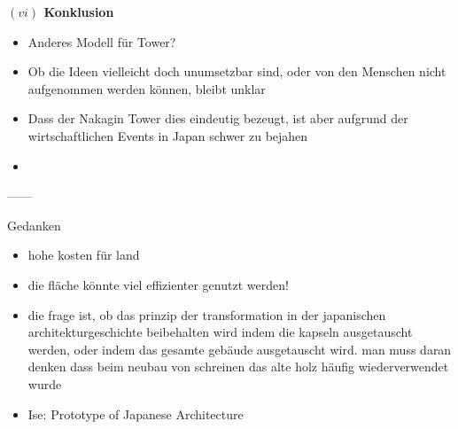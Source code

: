 \documentclass[a4paper, 12pt]{article}
\begin{document}
\begin{onehalfspace}


\vspace{5mm}
\noindent\textbf{$(vi)$ Konklusion}

\begin{itemize}
  \item Anderes Modell für Tower?
  \item Ob die Ideen vielleicht doch unumsetzbar sind, oder von den Menschen nicht aufgenommen werden können, bleibt unklar
  \item Dass der Nakagin Tower dies eindeutig bezeugt, ist aber aufgrund der wirtschaftlichen Events in Japan schwer zu bejahen
  \item 
\end{itemize}

------


Gedanken


\begin{itemize}
  \item hohe kosten für land
  \item die fläche könnte viel effizienter genutzt werden!
  \item die frage ist, ob das prinzip der transformation in der japanischen architekturgeschichte beibehalten wird indem die kapseln ausgetauscht werden, oder indem das gesamte gebäude ausgetauscht wird. man muss daran denken dass beim neubau von schreinen das alte holz häufig wiederverwendet wurde
  \item Ise: Prototype of Japanese Architecture
\end{itemize}


\end{onehalfspace}
\nocite{*}
\printbibliography

%
\end{document}
